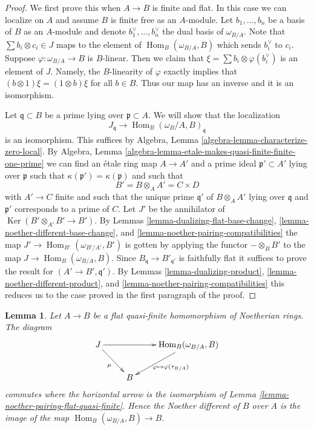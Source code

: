 \documentclass{stacks-project}
\theoremstyle{plain}
\newtheorem{lemma}[subsection]{Lemma}
\theoremstyle{definition}
\theoremstyle{remark}
\numberwithin{equation}{subsection}
\def\Hom{\mathop{\mathrm{Hom}}\nolimits}
\def\Ker{\mathop{\mathrm{Ker}}}
\begin{document}
\begin{proof}
We first prove this when $A \to B$ is finite and flat. In this case we can
localize on $A$ and assume $B$ is finite free as an $A$-module. Let
$b_1, \ldots, b_n$ be a basis of $B$ as an $A$-module and denote
$b_1^\vee, \ldots, b_n^\vee$ the dual basis of $\omega_{B/A}$. Note that
$\sum b_i \otimes c_i \in J$ maps to the element of $\Hom_B(\omega_{B/A}, B)$
which sends $b_i^\vee$ to $c_i$. Suppose $\varphi : \omega_{B/A} \to B$
is $B$-linear. Then we claim that $\xi = \sum b_i \otimes \varphi(b_i^\vee)$
is an element of $J$. Namely, the $B$-linearity of $\varphi$
exactly implies that $(b \otimes 1)\xi = (1 \otimes b)\xi$ for all $b \in B$.
Thus our map has an inverse and it is an isomorphism.

\medskip\noindent
Let $\mathfrak q \subset B$ be a prime lying over $\mathfrak p \subset A$.
We will show that the localization
$$
J_\mathfrak q
\longrightarrow
\Hom_B(\omega_B/A, B)_\mathfrak q
$$
is an isomorphism.
This suffices by Algebra, Lemma \ref{algebra-lemma-characterize-zero-local}.
By
Algebra, Lemma \ref{algebra-lemma-etale-makes-quasi-finite-finite-one-prime}
we can find an \'etale ring map $A \to A'$ and a prime
ideal $\mathfrak p' \subset A'$ lying over $\mathfrak p$
such that $\kappa(\mathfrak p') = \kappa(\mathfrak p)$ and
such that
$$
B' = B \otimes_A A' = C \times D
$$
with $A' \to C$ finite and such that the unique prime $\mathfrak q'$
of $B \otimes_A A'$ lying over $\mathfrak q$ and $\mathfrak p'$
corresponds to a prime of $C$. Let $J'$ be the annihilator of
$\Ker(B' \otimes_{A'} B' \to B')$. By
Lemmas \ref{lemma-dualizing-flat-base-change},
\ref{lemma-noether-different-base-change}, and
\ref{lemma-noether-pairing-compatibilities}
the map $J' \to \Hom_{B'}(\omega_{B'/A'}, B')$
is gotten by applying the functor $- \otimes_B B'$
to the map $J \to \Hom_B(\omega_{B/A}, B)$.
Since $B_\mathfrak q \to B'_{\mathfrak q'}$ is faithfully flat
it suffices to prove the result for $(A' \to B', \mathfrak q')$.
By Lemmas \ref{lemma-dualizing-product},
\ref{lemma-noether-different-product}, and
\ref{lemma-noether-pairing-compatibilities}
this reduces us to the case proved in the first
paragraph of the proof.
\end{proof}

\begin{lemma}
\label{lemma-noether-different-flat-quasi-finite}
Let $A \to B$ be a flat quasi-finite homomorphism of Noetherian rings.
The diagram
$$
\xymatrix{
J \ar[rr] \ar[rd]_\mu & &
\Hom_B(\omega_{B/A}, B) \ar[ld]^{\varphi \mapsto \varphi(\tau_{B/A})} \\
& B
}
$$
commutes where the horizontal arrow is the isomorphism of
Lemma \ref{lemma-noether-pairing-flat-quasi-finite}.
Hence the Noether different of $B$ over $A$
is the image of the map $\Hom_B(\omega_{B/A}, B) \to B$.
\end{lemma}
\end{document}
